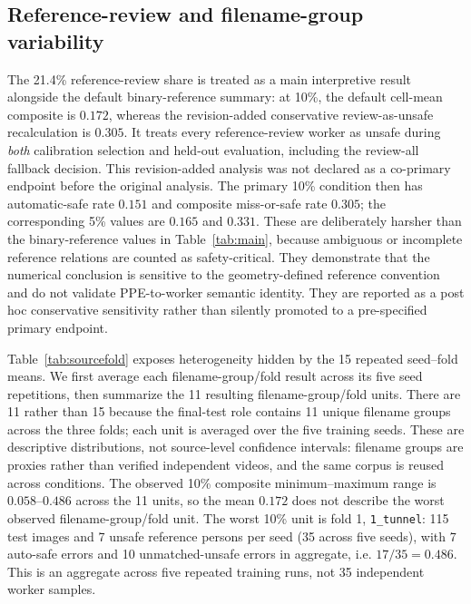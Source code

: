\documentclass[iicol,pdflatex,sn-mathphys-num]{sn-jnl}
\begin{document}
\subsection{Reference-review and filename-group variability}

The 21.4\% reference-review share is treated as a main interpretive result alongside the default binary-reference summary: at 10\%, the default cell-mean composite is $0.172$, whereas the revision-added conservative review-as-unsafe recalculation is $0.305$. It treats every reference-review worker as unsafe during \emph{both} calibration selection and held-out evaluation, including the review-all fallback decision. This revision-added analysis was not declared as a co-primary endpoint before the original analysis. The primary 10\% condition then has automatic-safe rate $0.151$ and composite miss-or-safe rate $0.305$; the corresponding 5\% values are $0.165$ and $0.331$. These are deliberately harsher than the binary-reference values in Table~\ref{tab:main}, because ambiguous or incomplete reference relations are counted as safety-critical. They demonstrate that the numerical conclusion is sensitive to the geometry-defined reference convention and do not validate PPE-to-worker semantic identity. They are reported as a post hoc conservative sensitivity rather than silently promoted to a pre-specified primary endpoint.

Table~\ref{tab:sourcefold} exposes heterogeneity hidden by the 15 repeated seed--fold means. We first average each filename-group/fold result across its five seed repetitions, then summarize the 11 resulting filename-group/fold units. There are 11 rather than 15 because the final-test role contains 11 unique filename groups across the three folds; each unit is averaged over the five training seeds. These are descriptive distributions, not source-level confidence intervals: filename groups are proxies rather than verified independent videos, and the same corpus is reused across conditions. The observed 10\% composite minimum--maximum range is $0.058$--$0.486$ across the 11 units, so the mean $0.172$ does not describe the worst observed filename-group/fold unit. The worst 10\% unit is fold 1, \texttt{1\_tunnel}: 115 test images and 7 unsafe reference persons per seed (35 across five seeds), with 7 auto-safe errors and 10 unmatched-unsafe errors in aggregate, i.e. $17/35=0.486$. This is an aggregate across five repeated training runs, not 35 independent worker samples.
\end{document}
